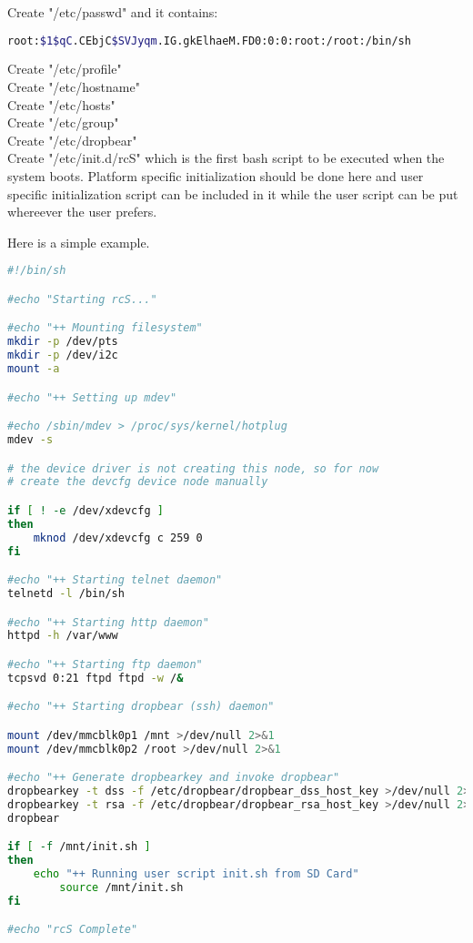 \documentclass[12pt]{article} %
\begin{document}
Create "/etc/passwd" and it contains:
\begin{lstlisting}[language=bash]
root:$1$qC.CEbjC$SVJyqm.IG.gkElhaeM.FD0:0:0:root:/root:/bin/sh
\end{lstlisting}

Create "/etc/profile" \\
Create "/etc/hostname" \\
Create "/etc/hosts" \\
Create "/etc/group" \\
Create "/etc/dropbear" \\
Create "/etc/init.d/rcS" which is the first bash script to be executed when the system boots.
Platform specific initialization should be done here and user specific initialization script 
can be included in it while the user script can be put whereever the user prefers.

Here is a simple example.
\begin{lstlisting}[language=bash]
#!/bin/sh

#echo "Starting rcS..."

#echo "++ Mounting filesystem"
mkdir -p /dev/pts
mkdir -p /dev/i2c
mount -a

#echo "++ Setting up mdev"

#echo /sbin/mdev > /proc/sys/kernel/hotplug
mdev -s

# the device driver is not creating this node, so for now
# create the devcfg device node manually

if [ ! -e /dev/xdevcfg ]
then
	mknod /dev/xdevcfg c 259 0
fi

#echo "++ Starting telnet daemon"
telnetd -l /bin/sh

#echo "++ Starting http daemon"
httpd -h /var/www

#echo "++ Starting ftp daemon"
tcpsvd 0:21 ftpd ftpd -w /&

#echo "++ Starting dropbear (ssh) daemon"

mount /dev/mmcblk0p1 /mnt >/dev/null 2>&1
mount /dev/mmcblk0p2 /root >/dev/null 2>&1

#echo "++ Generate dropbearkey and invoke dropbear"
dropbearkey -t dss -f /etc/dropbear/dropbear_dss_host_key >/dev/null 2>&1
dropbearkey -t rsa -f /etc/dropbear/dropbear_rsa_host_key >/dev/null 2>&1
dropbear

if [ -f /mnt/init.sh ]
then
	echo "++ Running user script init.sh from SD Card"
     	source /mnt/init.sh
fi

#echo "rcS Complete"
\end{lstlisting}
\end{document}
